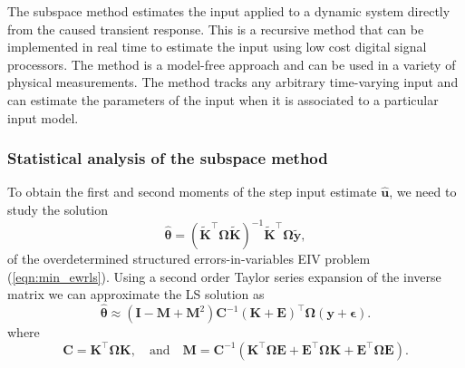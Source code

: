 The subspace method estimates the input applied to a dynamic system directly from the caused transient response.
This is a recursive method that can be implemented in real time to estimate the input  using low cost digital signal processors.
The method is a model-free approach and can be used in a variety of physical measurements.
The method  tracks any arbitrary time-varying input and can estimate the parameters of the input when it is associated to a particular input model.


\subsubsection{Statistical analysis of the subspace method}

To obtain the first and second moments of the step input estimate $\widehat{\mathbf{u}}$, we need to study the solution
\begin{equation} \widehat{\bm{\theta}} = ( \widetilde{\mathbf{K}}^\top \bm{\Omega} \widetilde{\mathbf{K}}  )^{-1} \widetilde{\mathbf{K}}^\top \bm{\Omega} \widetilde{\mathbf{y}} , \label{eqn:xhatW} \end{equation}
of the overdetermined structured errors-in-variables EIV problem (\ref{eqn:min_ewrls}).
Using a second order Taylor series expansion of the inverse matrix we can approximate the LS solution as
\begin{equation} \widehat{\bm{\theta}} \approx \left( \mathbf{I} - \mathbf{M} + \mathbf{M}^2 \right) \mathbf{C}^{-1} (\mathbf{K} + \mathbf{E})^\top \bm{\Omega} (\mathbf{y} + \bm{\epsilon}). \label{eqn:xhatexpW} \end{equation} 
where 
\begin{equation} \mathbf{C} = \mathbf{K}^\top \bm{\Omega} \mathbf{K}, \quad \text{and} \quad \mathbf{M} = \mathbf{C}^{-1} ( \mathbf{K}^\top \bm{\Omega} \mathbf{E} + \mathbf{E}^\top \bm{\Omega} \mathbf{K} + \mathbf{E}^\top \bm{\Omega} \mathbf{E} ). \end{equation} 

